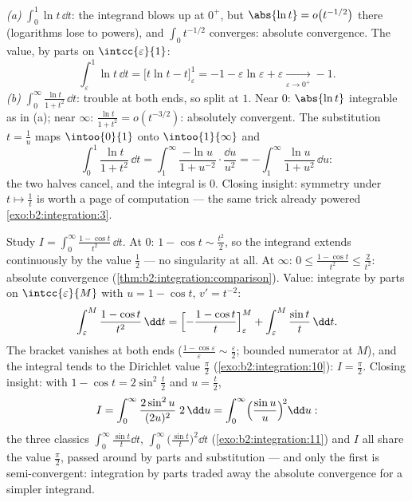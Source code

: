 \begin{example}\label{ex:b2:integration:warmups}
\emph{(a)} $\displaystyle\int_0^1 \ln t\,\dd t$: the integrand
blows up at $0^+$, but $\abs{\ln t} = o\bigl(t^{-1/2}\bigr)$
there (logarithms lose to powers), and $\int_0 t^{-1/2}$
converges: absolute convergence. The value, by parts on
$\intcc{\varepsilon}{1}$:
\[
\int_\varepsilon^1 \ln t\,\dd t
= \bigl[t\ln t - t\bigr]_\varepsilon^1
= -1 - \varepsilon\ln\varepsilon + \varepsilon
\xrightarrow[\varepsilon\to0^+]{} -1 .
\]
\emph{(b)} $\displaystyle\int_0^\infty \frac{\ln t}{1 +
t^2}\,\dd t$: trouble at both ends, so split at $1$. Near $0$:
$\abs{\ln t}$ integrable as in (a); near $\infty$: $\frac{\ln
t}{1+t^2} = o(t^{-3/2})$: absolutely convergent. The
substitution $t = \frac1u$ maps $\intoo{0}{1}$ onto
$\intoo{1}{\infty}$ and
\[
\int_0^1 \frac{\ln t}{1+t^2}\,\dd t
= \int_1^{\infty} \frac{-\ln u}{1 + u^{-2}}\cdot
\frac{\dd u}{u^2}
= -\int_1^\infty \frac{\ln u}{1+u^2}\,\dd u :
\]
the two halves cancel, and the integral is $0$. Closing
insight: symmetry under $t \mapsto \frac1t$ is worth a page of
computation --- the same trick already powered
\cref{exo:b2:integration:3}.
\end{example}

\begin{example}\label{ex:b2:integration:onecos}
Study $I = \displaystyle\int_0^{\infty} \frac{1 - \cos
t}{t^2}\,\dd t$. At $0$: $1 - \cos t \sim \frac{t^2}2$, so the
integrand extends continuously by the value $\frac12$ --- no
singularity at all. At $\infty$: $0 \leq \frac{1 - \cos t}{t^2}
\leq \frac{2}{t^2}$: absolute convergence
(\cref{thm:b2:integration:comparison}). Value: integrate by
parts on $\intcc{\varepsilon}{M}$ with $u = 1 - \cos t$, $v' =
t^{-2}$:
\[
\int_\varepsilon^M \frac{1 - \cos t}{t^2}\,\dd t
= \Bigl[-\frac{1 - \cos t}{t}\Bigr]_\varepsilon^M
+ \int_\varepsilon^M \frac{\sin t}{t}\,\dd t .
\]
The bracket vanishes at both ends ($\frac{1 -
\cos\varepsilon}{\varepsilon} \sim \frac\varepsilon2$; bounded
numerator at $M$), and the integral tends to the Dirichlet value
$\frac\pi2$ (\cref{exo:b2:integration:10}): $I = \frac\pi2$.
Closing insight: with $1 - \cos t = 2\sin^2\frac t2$ and $u =
\frac t2$,
\[
I = \int_0^\infty \frac{2\sin^2 u}{(2u)^2}\;2\,\dd u
= \int_0^\infty \Bigl(\frac{\sin u}{u}\Bigr)^{\!2}\dd u :
\]
the three classics $\int_0^\infty\frac{\sin t}{t}\dd t$,
$\int_0^\infty\bigl(\frac{\sin t}{t}\bigr)^2\dd t$
(\cref{exo:b2:integration:11}) and $I$ all share the value
$\frac\pi2$, passed around by parts and substitution --- and
only the first is semi-convergent: integration by parts traded
away the absolute convergence for a simpler integrand.
\end{example}

